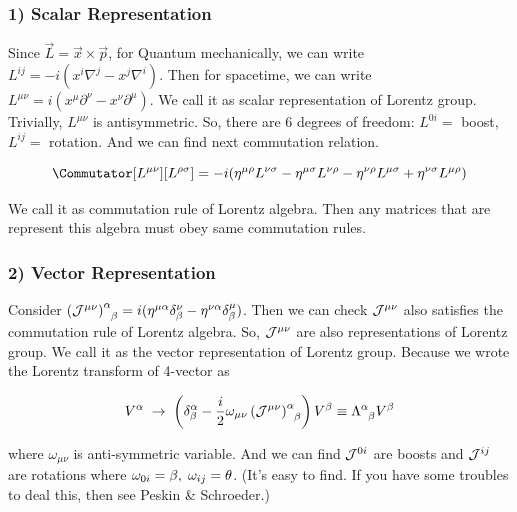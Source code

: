 \documentclass[11pt,letterpaper]{article}
\begin{document}
\subsubsection*{1) Scalar Representation}

Since $\vec{L} = \vec{x} \times \vec{p}$, for Quantum mechanically, we can write $L^{ij} = -i(x^i\nabla^j - x^j\nabla^i)$. Then for spacetime, we can write
$L^{\mu\nu} = i(x^\mu\partial^\nu - x^\nu\partial^\mu)$. We call it as scalar representation of Lorentz group. Trivially, $L^{\mu\nu}$ is antisymmetric. So, 
there are 6 degrees of freedom: $L^{0i} =$ boost, $L^{ij} =$ rotation. And we can find next commutation relation.

\begin{equation}
 \Commutator[L^{\mu\nu}][L^{\rho\sigma}] = -i(\eta^{\mu\rho}L^{\nu\sigma}-\eta^{\mu\sigma}L^{\nu\rho} - \eta^{\nu\rho}L^{\mu\sigma} +\eta^{\nu\sigma}L^{\mu\rho})
\end{equation}

\VS

We call it as commutation rule of Lorentz algebra. Then any matrices that are represent this algebra must obey same commutation rules.

\subsubsection*{2) Vector Representation}

Consider $\tensor{\BKS{\J{\mu\nu}}}{^\alpha _\beta} = i(\eta^{\mu\alpha}\delta^\nu_\beta - \eta^{\nu\alpha}\delta^\mu_\beta)$. \footnotemark[1]
Then we can check $\mathcal{J}^{\mu\nu}$ also satisfies the commutation rule of Lorentz algebra. So, $\mathcal{J}^{\mu\nu}$ are also representations of Lorentz group.
We call it as the vector representation of Lorentz group. Because we wrote the Lorentz transform of 4-vector as 

\begin{equation}
 V^\alpha \hs \rightarrow \hs \BKS{\delta^\alpha_\beta - \frac{i}{2}\omega_{\mu\nu}\tensor{\BKS{\J{\mu\nu}}}{^\alpha _\beta}}V^\beta \equiv \tensor{\Lambda}{^\alpha _\beta}V^\beta
\end{equation}

\VS

where $\omega_{\mu\nu}$ is anti-symmetric variable. And we can find $\mathcal{J}^{0i}$ are boosts and $\mathcal{J}^{ij}$ are rotations where $\omega_{0i} = \beta,\hspace{0.1cm} \omega_{ij} = \theta$.
(It's easy to find. If you have some troubles to deal this, then see Peskin \& Schroeder.)
\end{document}
